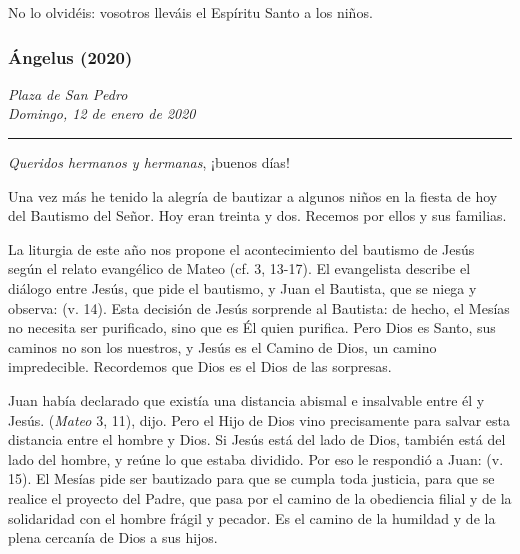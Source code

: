 \begin{body}
\begin{body}
{No lo olvidéis: vosotros lleváis el Espíritu Santo a los niños.



\subsubsection{Ángelus (2020)} \emph{Plaza de San Pedro\\ Domingo, 12 de enero de 2020}

\begin{center}\rule{0.5\linewidth}{\linethickness}\end{center}



\emph{Queridos hermanos y hermanas}, ¡buenos días!

Una vez más he tenido la alegría de bautizar a algunos niños en la fiesta de hoy del Bautismo del Señor. Hoy eran treinta y dos. Recemos por ellos y sus familias.

La liturgia de este año nos propone el acontecimiento del bautismo de Jesús según el relato evangélico de Mateo (cf. 3, 13-17). El evangelista describe el diálogo entre Jesús, que pide el bautismo, y Juan el Bautista, que se niega y observa:  (v. 14). Esta decisión de Jesús sorprende al Bautista: de hecho, el Mesías no necesita ser purificado, sino que es Él quien purifica. Pero Dios es Santo, sus caminos no son los nuestros, y Jesús es el Camino de Dios, un camino impredecible. Recordemos que Dios es el Dios de las sorpresas.

Juan había declarado que existía una distancia abismal e insalvable entre él y Jesús.  (\emph{Mateo} 3, 11), dijo. Pero el Hijo de Dios vino precisamente para salvar esta distancia entre el hombre y Dios. Si Jesús está del lado de Dios, también está del lado del hombre, y reúne lo que estaba dividido. Por eso le respondió a Juan:  (v. 15). El Mesías pide ser bautizado para que se cumpla toda justicia, para que se realice el proyecto del Padre, que pasa por el camino de la obediencia filial y de la solidaridad con el hombre frágil y pecador. Es el camino de la humildad y de la plena cercanía de Dios a sus hijos.

}
\end{body}
\end{body}
